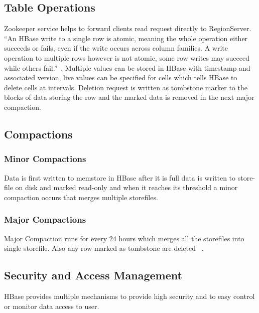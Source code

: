 \subsection{Table Operations} 

Zookeeper service helps to forward clients read request directly to RegionServer.
``An HBase write to a single row is atomic, meaning the whole operation either 
succeeds or fails, even if the write occurs across column families. A write 
operation to multiple rows however is not atomic, some row writes may succeed 
while others fail.''~\cite{hid-sp18-421-HBase-tableoper}. Multiple values can be
stored in HBase with timestamp and associated version, live values can be 
specified for cells which tells HBase to delete cells at intervals. Deletion 
request is written as tombstone marker to the blocks of data storing the row and 
the marked data is removed in the next major compaction.

\subsection{Compactions} 

\subsubsection{Minor Compactions}

Data is first written to memstore in HBase after it is full data is written to 
store-file on disk and marked read-only and when it reaches its threshold a minor
compaction occurs that merges multiple storefiles.

\subsubsection{Major Compactions}
Major Compaction runs for every 24 hours which merges all the storefiles into 
single storefile. Also any row marked as tombstone are deleted
~\cite{hid-sp18-421-HBase-tableoper}.


\subsection{Security and Access Management} 

HBase provides multiple mechanisms to provide high security and to easy control
or monitor data access to user.

